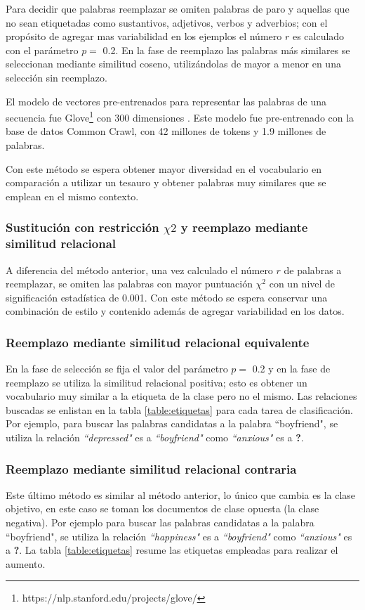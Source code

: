 Para decidir que palabras reemplazar se omiten palabras de paro y aquellas que no sean etiquetadas como sustantivos, adjetivos, verbos y adverbios; con el propósito de agregar mas variabilidad en los ejemplos el número $r$ es calculado con el parámetro $p=$ 0.2. En la fase de reemplazo las palabras más similares se seleccionan mediante similitud coseno, utilizándolas de mayor a menor en una selección sin reemplazo.

El modelo de vectores pre-entrenados para representar las palabras de una secuencia fue Glove\footnote{https://nlp.stanford.edu/projects/glove/} con 300 dimensiones \citep{pennington2014glove}. Este modelo fue pre-entrenado con la base de datos Common Crawl, con 42 millones de  tokens y 1.9 millones de palabras. 

Con este método se espera obtener mayor diversidad en el vocabulario en comparación a utilizar un tesauro y obtener palabras muy similares que se emplean en el mismo contexto.

\subsubsection{Sustitución con restricción $\chi2$  y reemplazo mediante similitud relacional}
A diferencia del método anterior, una vez calculado el número $r$ de palabras a reemplazar, se omiten las palabras con mayor puntuación $\chi^2$ con un nivel de significación estadística de 0.001. Con este método se espera conservar una combinación de estilo y contenido además de agregar variabilidad en los datos. 

\subsubsection{Reemplazo mediante similitud relacional equivalente}
En la fase de selección se fija el valor del parámetro $p=$ 0.2 y en la fase de reemplazo se utiliza la similitud relacional positiva; esto es obtener un vocabulario muy similar a la etiqueta de la clase pero no el mismo. Las relaciones buscadas se enlistan en la tabla \ref{table:etiquetas} para cada tarea de clasificación. Por ejemplo, para buscar las palabras candidatas a la palabra ``boyfriend", se utiliza la relación \textit{``depressed"} es a \textit{``boyfriend"} como \textit{``anxious"} es a \textbf{?}. 

\subsubsection{Reemplazo mediante similitud relacional contraria}
Este último método es similar al método anterior, lo único que cambia es la clase objetivo, en este caso se toman los documentos de clase opuesta (la clase negativa). Por ejemplo para buscar las palabras candidatas a la palabra ``boyfriend", se utiliza la relación \textit{``happiness"} es a \textit{``boyfriend"} como \textit{``anxious"} es a \textbf{?}. La tabla \ref{table:etiquetas} resume las etiquetas empleadas para realizar el aumento.

